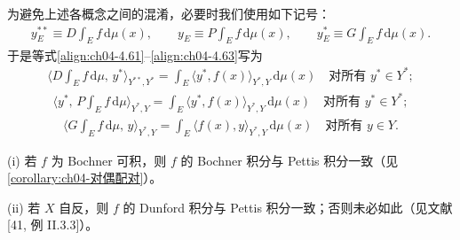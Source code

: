 \documentclass[../../main.tex]{subfiles}%
\begin{document}
为避免上述各概念之间的混淆，必要时我们使用如下记号：
\begin{align*}
y_E^{**}\equiv D\!\int_E f\,\mathrm{d}\mu(x),\qquad
y_E\equiv P\!\int_E f\,\mathrm{d}\mu(x),\qquad
y_E^*\equiv G\!\int_E f\,\mathrm{d}\mu(x).
\end{align*}
于是等式\eqref{align:ch04-4.61}--\eqref{align:ch04-4.63}写为
\begin{align}
\Big\langle D\!\int_E f\,\mathrm{d}\mu,\,y^*\Big\rangle_{Y^{**},Y^*}=\int_E\langle y^*,f(x)\rangle_{Y^*,Y}\,\mathrm{d}\mu(x)\quad\text{对所有 }y^*\in Y^*; \label{align:ch04-4.64a}
\end{align}
\begin{align}
\Big\langle y^*,\,P\!\int_E f\,\mathrm{d}\mu\Big\rangle_{Y^*,Y}=\int_E\langle y^*,f(x)\rangle_{Y^*,Y}\,\mathrm{d}\mu(x)\quad\text{对所有 }y^*\in Y^*; \label{align:ch04-4.64b}
\end{align}
\begin{align}
\Big\langle G\!\int_E f\,\mathrm{d}\mu,\,y\Big\rangle_{Y^*,Y}=\int_E\langle f(x),y\rangle_{Y^*,Y}\,\mathrm{d}\mu(x)\quad\text{对所有 }y\in Y. \label{align:ch04-4.64c}
\end{align}

\begin{remark}\label{remark:ch04-弱积分比较}
(i) 若 $f$ 为 Bochner 可积，则 $f$ 的 Bochner 积分与 Pettis 积分一致（见\cref{corollary:ch04-对偶配对}）。

(ii) 若 $X$ 自反，则 $f$ 的 Dunford 积分与 Pettis 积分一致；否则未必如此（见文献 [41, 例 II.3.3]）。
\end{remark}
\end{document}
